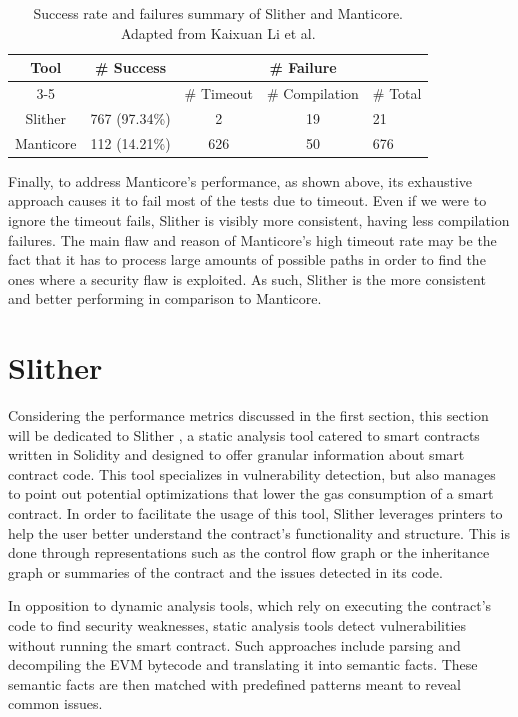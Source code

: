 \begin{table}
\centering
\begin{tabular}{ccccl}
\hline
\multirow{2}{*}{Tool} & \multirow{2}{*}{\# Success} & \multicolumn{3}{c}{\# Failure}         \\ \cline{3-5} 
                      &                             & \# Timeout & \# Compilation & \# Total \\ \hline
Slither               & 767 (97.34\%)               & 2          & 19             & 21       \\
Manticore             & 112 (14.21\%)               & 626        & 50             & 676      \\ \hline
\end{tabular}
\caption{Success rate and failures summary of Slither and Manticore. Adapted from Kaixuan Li et al. \cite{staticAnalysisToolsComparison}}
\label{tab:my-table2}
\end{table}

Finally, to address Manticore's performance, as shown above, its exhaustive approach causes it to fail most of the tests due to timeout. Even if we were to ignore the timeout fails, Slither is visibly more consistent, having less compilation failures. The main flaw and reason of Manticore's high timeout rate may be the fact that it has to process large amounts of possible paths in order to find the ones where a security flaw is exploited. As such, Slither is the more consistent and better performing in comparison to Manticore.

\section{Slither}

Considering the performance metrics discussed in the first section, this section will be dedicated to Slither \cite{slither}, a static analysis tool catered to smart contracts written in Solidity and designed to offer granular information about smart contract code. This tool specializes in vulnerability detection, but also manages to point out potential optimizations that lower the gas consumption of a smart contract. In order to facilitate the usage of this tool, Slither leverages printers to help the user better understand the contract’s functionality and structure. This is done through representations such as the control flow graph or the inheritance graph or summaries of the contract and the issues detected in its code. 

In opposition to dynamic analysis \cite{staticDynamicAnalysisComparison} tools, which rely on executing the contract’s code to find security weaknesses, static analysis tools detect vulnerabilities without running the smart contract. Such approaches include parsing and decompiling the EVM bytecode and translating it into semantic facts. These semantic facts are then matched with predefined patterns meant to reveal common issues.

